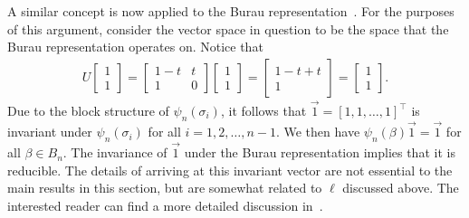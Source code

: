 

A similar concept is now applied to the Burau representation~\cite{Delaney2016}. For the purposes of this argument, consider the vector space in question to be the space that the Burau representation operates on. Notice that
\begin{align}
    U\begin{bmatrix}
        1\\1
    \end{bmatrix} = \begin{bmatrix}
        1-t & t \\ 1 & 0
    \end{bmatrix}\begin{bmatrix}
        1\\1
    \end{bmatrix} = \begin{bmatrix}
        1-t+t \\ 1
    \end{bmatrix} = \begin{bmatrix}
        1 \\ 1
    \end{bmatrix}.
\end{align}
Due to the block structure of $\psi_n(\sigma_i)$, it follows that $\vec{1}=[1,1,\dots,1]^\top$ is invariant under $\psi_n(\sigma_i)$ for all $i=1,2,\dots,n-1$. We then have $\psi_n(\beta)\vec{1}=\vec{1}$ for all $\beta\in B_n$. The invariance of $\vec{1}$ under the Burau representation implies that it is reducible. The details of arriving at this invariant vector are not essential to the main results in this section, but are somewhat related to $\ell$ discussed above. The interested reader can find a more detailed discussion in~\cite{Delaney2016}.

